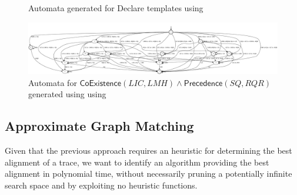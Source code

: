 \begin{figure}[!t]
	\centering
	\quad
	\quad
	\caption{Automata generated for Declare templates using \cite{GiacomoV13,GiacomoMM14}}\label{fig:mma1}
\end{figure}
\begin{figure}
	\centering
	\includegraphics[width=\textheight,angle=90]{images/g3.png}\caption{Automata for $\mathsf{CoExistence}(\textit{LIC},\textit{LMH})\wedge\mathsf{Precedence}(\textit{SQ},\textit{RQR})$ generated using using \cite{GiacomoV13,GiacomoMM14}}\label{fig:mma2}\quad
\end{figure}
\subsection{Approximate Graph Matching}\label{ref:agm}
Given that the previous approach requires an heuristic for determining the best alignment of a trace, we want to identify an algorithm providing the best alignment in polynomial time, without necessarily pruning a potentially infinite search space and by exploiting no heuristic functions. 

